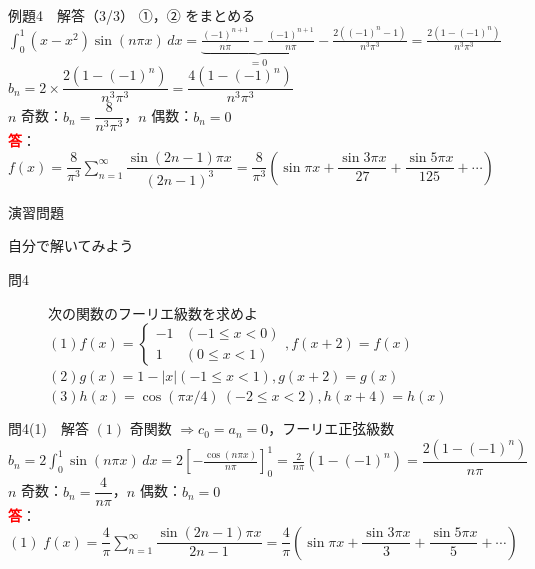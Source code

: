 \documentclass[professionalfonts]{beamer}
\begin{document}
\begin{frame}{例題4　解答（3/3）}
  ①，② をまとめる\\[4pt]
  $\displaystyle\int_{0}^{1}(x-x^{2})\sin(n\pi x)\,dx
  =\underbrace{\frac{(-1)^{n+1}}{n\pi}-\frac{(-1)^{n+1}}{n\pi}}_{=0}
  -\frac{2((-1)^{n}-1)}{n^{3}\pi^{3}}
  =\frac{2(1-(-1)^{n})}{n^{3}\pi^{3}}$\\[6pt]
  $b_{n}=2\times\dfrac{2(1-(-1)^{n})}{n^{3}\pi^{3}}=\dfrac{4(1-(-1)^{n})}{n^{3}\pi^{3}}$\\[4pt]
  $n$ 奇数：$b_{n}=\dfrac{8}{n^{3}\pi^{3}}$，$n$ 偶数：$b_{n}=0$\\[8pt]
  \textcolor{red}{\textbf{答}}：$f(x) = \dfrac{8}{\pi^{3}}\displaystyle\sum_{n=1}^{\infty} \dfrac{\sin(2n-1)\pi x}{(2n-1)^{3}} = \dfrac{8}{\pi^{3}}\!\left(\sin \pi x + \dfrac{\sin 3\pi x}{27} + \dfrac{\sin 5\pi x}{125} + \cdots\right)$
\end{frame}

\begin{frame}{演習問題}
  \begin{exampleblock}{自分で解いてみよう}
  \begin{description}
    \item[問4] 次の関数のフーリエ級数を求めよ
    $(1) f(x) = \begin{cases} -1 & (-1 \leq x < 0) \\ 1 & (0 \leq x < 1) \end{cases},  f(x+2) = f(x)$\\
    $(2) g(x) = 1 - |x|  (-1 \leq x < 1),  g(x+2) = g(x)$\\
    $(3) h(x) = \cos(\pi x/4) \ (-2 \leq x < 2),  h(x+4) = h(x)$\\
  \end{description}
  \end{exampleblock}
\end{frame}

\begin{frame}{問4(1)　解答}
  $(1)$ 奇関数 $\Rightarrow c_{0}=a_{n}=0$，フーリエ正弦級数\\[4pt]
  $\displaystyle b_{n}=2\int_{0}^{1}\sin(n\pi x)\,dx
  =2\left[-\frac{\cos(n\pi x)}{n\pi}\right]_{0}^{1}
  =\frac{2}{n\pi}(1-(-1)^{n})=\dfrac{2(1-(-1)^{n})}{n\pi}$\\[6pt]
  $n$ 奇数：$b_{n}=\dfrac{4}{n\pi}$，$n$ 偶数：$b_{n}=0$\\[8pt]
  \textcolor{red}{\textbf{答}}：
  $(1)\; f(x) = \dfrac{4}{\pi}\displaystyle\sum_{n=1}^{\infty} \dfrac{\sin(2n-1)\pi x}{2n-1} = \dfrac{4}{\pi}\!\left(\sin \pi x + \dfrac{\sin 3\pi x}{3} + \dfrac{\sin 5\pi x}{5} + \cdots\right)$
\end{frame}
\end{document}

